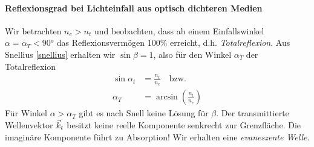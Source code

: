 

\paragraph{Reflexionsgrad bei Lichteinfall aus optisch dichteren
  Medien}
Wir betrachten $n_e>n_t$ und beobachten, dass ab einem
Einfallswinkel $\alpha=\alpha_T<\ang{90}$ das Reflexionsvermögen
100\% erreicht, d.h. \emph{Totalreflexion}.
Aus Snellius \eqref{snellius} erhalten wir $\sin\beta = 1$, 
also für den Winkel $\alpha_T$%
der Totalreflexion
\begin{align*}
  \sin\alpha_t &= \frac{n_t}{n_e} \quad\text{bzw.}\\
  \alpha_T &= \arcsin(\frac{n_t}{n_e})
\end{align*}
Für Winkel $\alpha>\alpha_T$ gibt es nach Snell keine Lösung
für $\beta$. Der transmittierte Wellenvektor $\vec{k}_t$ besitzt
keine reelle Komponente senkrecht zur Grenzfläche.
Die imaginäre Komponente führt zu Absorption! Wir erhalten eine
\emph{evaneszente Welle}.


